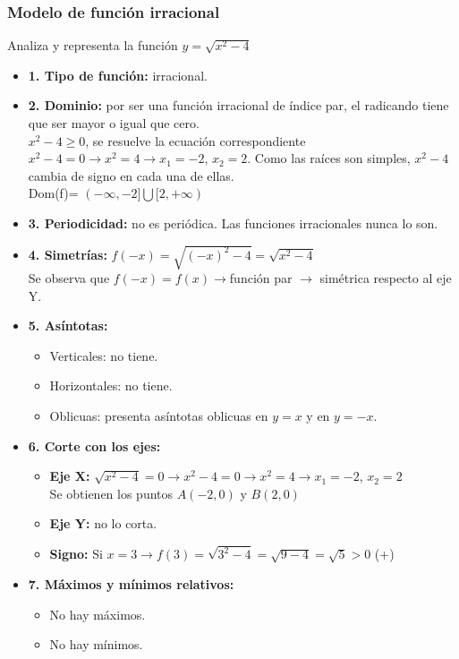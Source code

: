 
\subsubsection{Modelo de función irracional}
Analiza y representa la función $y=\sqrt{x^2-4}$
\begin{itemize}
	\item \textbf{1. Tipo de función: }irracional.
	\item \textbf{2. Dominio: }por ser una función irracional de índice par, el radicando tiene que ser mayor o igual que cero.\\
	$x^2-4 \geq 0$, se resuelve la ecuación correspondiente $x^2-4=0 \rightarrow x^2=4 \rightarrow x_1=-2$, $x_2=2$. Como las raíces son simples, $x^2-4$ cambia de signo en cada una de ellas.\\
	Dom(f)= $(-\infty, -2] \bigcup [2, +\infty)$
	\item \textbf{3. Periodicidad: }no es periódica. Las funciones irracionales nunca lo son.
	\item \textbf{4. Simetrías: }$f(-x) = \sqrt{(-x)^2-4} = \sqrt{x^2-4}$\\
	Se observa que $f(-x)=f(x) \rightarrow $función par $\rightarrow$ simétrica respecto al eje Y.
	\item \textbf{5. Asíntotas: }
	\begin{itemize}
		\item Verticales: no tiene.
		\item Horizontales: no tiene.
		\item Oblicuas: presenta asíntotas oblicuas en $y=x$ y en $y=-x$.
	\end{itemize}
	\item \textbf{6. Corte con los ejes: }
	\begin{itemize}
		\item \textbf{Eje X: }$\sqrt{x^2-4} = 0 \rightarrow x^2-4=0 \rightarrow x^2=4 \rightarrow x_1=-2$, $x_2=2$\\
		Se obtienen los puntos $A(-2, 0)$ y $B(2,0)$
		\item \textbf{Eje Y: }no lo corta.
		\item \textbf{Signo: }Si $x=3 \rightarrow f(3)=\sqrt{3^2-4}=\sqrt{9-4}=\sqrt{5}>0$ (+)
	\end{itemize}
	\item \textbf{7. Máximos y mínimos relativos: }
	\begin{itemize}
		\item No hay máximos.
		\item No hay mínimos.

\end{itemize}
\end{itemize}
